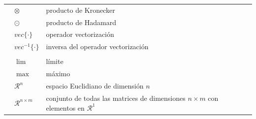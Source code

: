 \begin{tabular}{p{0.3cm} p{2.5cm} p{16cm}}
&$\otimes$& producto de Kronecker \\
&$\odot$& producto de Hadamard \\
&$vec\{\cdot \}$& operador vectorización \\
&$vec^{-1}\{\cdot \}$& inversa del operador vectorización \\
& & \\
&$\lim$& límite \\
&$\max$& máximo \\
&$\mathcal{R}^n$& espacio Euclidiano de dimensión $n$\\
&$\mathcal{R}^{n\times m}$&  conjunto de todas las matrices de dimensiones $n \times m$ con elementos en $\mathcal{R}^1$\\
\end{tabular}

